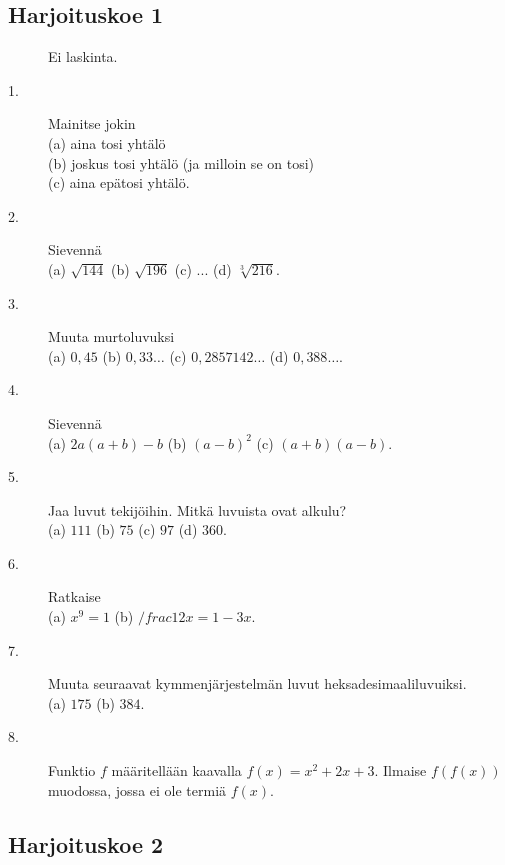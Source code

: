 \subsection*{Harjoituskoe 1}


\begin{description}
	\item[] Ei laskinta.
	\item[1.] Mainitse jokin \\
	(a) aina tosi yhtälö \\
	(b) joskus tosi yhtälö (ja milloin se on tosi) \\
	(c) aina epätosi yhtälö.
	\item[2.] Sievennä \\
	(a) $\sqrt{144}$ \qquad
	(b) $\sqrt{196}$ \qquad
	(c) $ ... $ \qquad
	(d) $\sqrt[3]{216}$.
	\item[3.] Muuta murtoluvuksi \\
	(a) $0,45$ \qquad
	(b) $0,33\ldots$ \qquad
	(c) $0,2857142\ldots$ \qquad
	(d) $0,388\ldots$.
	\item[4.] Sievennä \\
	(a) $2a(a+b)-b$ \qquad
	(b) $(a-b)^2$ \qquad
	(c) $(a+b)(a-b)$.
	\item[5.] Jaa luvut tekijöihin. Mitkä luvuista ovat alkulu? \\
	(a) $111$ \qquad
	(b) $75$ \qquad
	(c) $97$ \qquad
	(d) $360$.
	\item[6.] Ratkaise \\
	(a) $x^9 = 1$ \qquad
	(b) $/frac{1}{2}x=1-3x$.
	\item[7.] Muuta seuraavat kymmenjärjestelmän luvut heksadesimaaliluvuiksi. \\
	(a) $175$ \qquad
	(b) $384$.
	\item[8.] Funktio $f$ määritellään kaavalla $f(x) = x^2 + 2x + 3$. Ilmaise $f(f(x))$ muodossa, jossa ei ole termiä $f(x)$.
\end{description}

\subsection*{Harjoituskoe 2}


